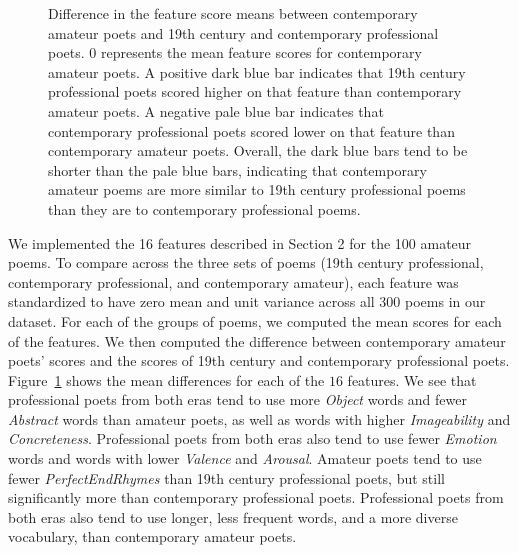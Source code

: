 \documentclass{book}
\begin{document}
\begin{figure}
\label{fig3}
\caption{Difference in the feature score means between contemporary amateur poets and 19th century and contemporary professional poets. $0$ represents the mean feature scores for contemporary amateur poets. A positive dark blue bar indicates that 19th century professional poets scored higher on that feature than contemporary amateur poets. A negative pale blue bar indicates that contemporary professional poets scored lower on that feature than contemporary amateur poets. Overall, the dark blue bars tend to be shorter than the pale blue bars, indicating that contemporary amateur poems are more similar to 19th century professional poems than they are to contemporary professional poems.} 
\end{figure}

We implemented the 16 features described in Section 2 for the 100 amateur poems. To compare across the three sets of poems (19th century professional, contemporary professional, and contemporary amateur), each feature was standardized to have zero mean and unit variance across all 300 poems in our dataset. For each of the groups of poems, we computed the mean scores for each of the features. We then computed the difference between contemporary amateur poets' scores and the scores of 19th century and contemporary professional poets. Figure~\ref{fig3} shows the mean differences for each of the $16$ features. We see that professional poets from both eras tend to use more \emph{Object} words and fewer \emph{Abstract} words than amateur poets, as well as words with higher \emph{Imageability} and \emph{Concreteness}. Professional poets from both eras also tend to use fewer \emph{Emotion} words and words with lower \emph{Valence} and \emph{Arousal}. Amateur poets tend to use fewer \emph{PerfectEndRhymes} than 19th century professional poets, but still significantly more than contemporary professional poets. Professional poets from both eras also tend to use longer, less frequent words, and a more diverse vocabulary, than contemporary amateur poets.
\end{document}
